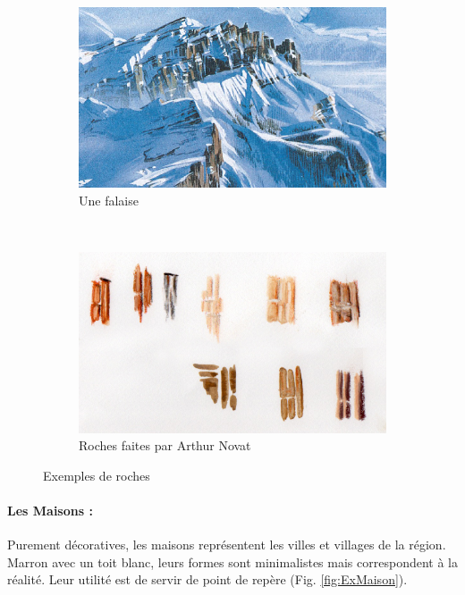 \begin{figure}[h!]
\centering
 \begin{subfigure}[t]{0.47\textwidth}
 \centering
 \includegraphics[width=1.0\linewidth]{novat/rochers_zoom.png}
 \caption{\label{fig:falaise} Une falaise}
 \end{subfigure}%
 ~
 \hspace{.05\textwidth}
 \begin{subfigure}[t]{0.47\textwidth}
 \centering
 \includegraphics[width=1.0\linewidth]{novat/novat_roches.png}
 \caption{\label{fig:rochersseul} Roches faites par Arthur Novat}
 \end{subfigure}
 \caption{\label{fig:ExRoche} Exemples de roches}
\end{figure}

\paragraph*{Les Maisons :} Purement décoratives, les maisons représentent les villes et villages de la région. Marron avec un toit blanc, leurs formes sont minimalistes mais correspondent à la réalité. Leur utilité est de servir de point de repère (Fig. \ref{fig:ExMaison}).


